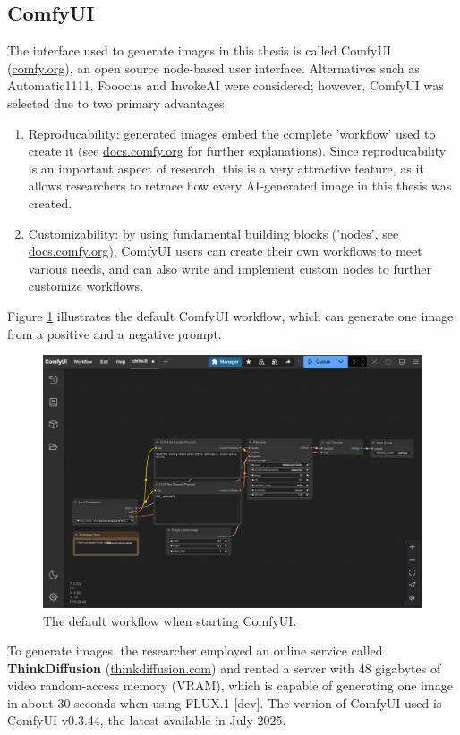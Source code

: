 \subsection{ComfyUI}
\sloppy
The interface used to generate images in this thesis is called ComfyUI (\href{https://www.comfy.org/}{comfy.org}), an open source node-based user interface. Alternatives such as Automatic1111, Fooocus and InvokeAI were considered; however, ComfyUI was selected due to two primary advantages. 
\begin{enumerate}
    \item Reproducability: generated images embed the complete 'workflow' used to create it (see \href{https://docs.comfy.org/development/core-concepts/workflow}{docs.comfy.org} for further explanations). Since reproducability is an important aspect of research, this is a very attractive feature, as it allows researchers to retrace how every AI-generated image in this thesis was created.
    \item Customizability: by using fundamental building blocks ('nodes', see \href{https://docs.comfy.org/development/core-concepts/nodes}{docs.comfy.org}), ComfyUI users can create their own workflows to meet various needs, and can also write and implement custom nodes to further customize workflows.
\end{enumerate}
Figure \ref{fig:comfy interface} illustrates the default ComfyUI workflow, which can generate one image from a positive and a negative prompt.
\begin{figure}[H]
    \centering
    \includegraphics[width=0.8\linewidth]{Images//Methodology/comfyui_new_interface.jpg}
    \caption{The default workflow when starting ComfyUI.}
    \label{fig:comfy interface}
\end{figure}

To generate images, the researcher employed an online service called \textbf{ThinkDiffusion} (\href{https://www.thinkdiffusion.com/}{thinkdiffusion.com}) and rented a server with 48 gigabytes of video random-access memory (VRAM), which is capable of generating one image in about 30 seconds when using FLUX.1 [dev]. The version of ComfyUI used is ComfyUI v0.3.44, the latest available in July 2025.

